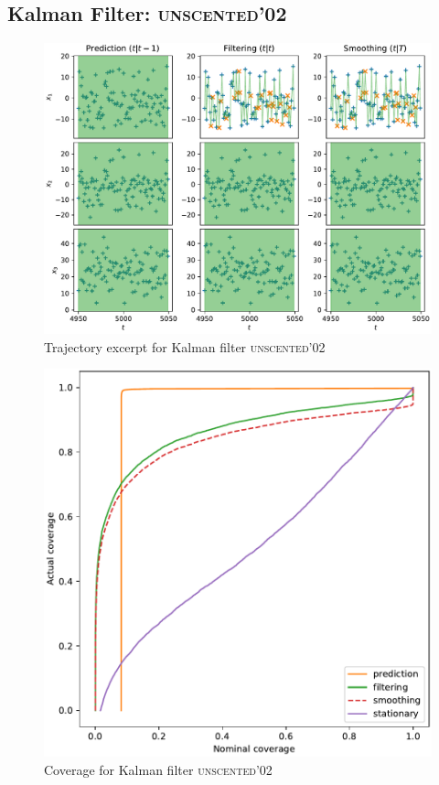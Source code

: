 \subsection{Kalman Filter: {\textsc{unscented'02}}}
\begin{figure}[H]
\begin{center}
\includegraphics[width=\linewidth]{generated/trajectory/Method.UNSCENTED1-Recalibrate.NO.pdf}
\end{center}
\caption{Trajectory excerpt for Kalman filter \textsc{{\textsc{unscented'02}}}}
\end{figure}
\begin{figure}[H]
\begin{center}
\includegraphics[width=\linewidth]{generated/coverage/Method.UNSCENTED1-Recalibrate.NO.pdf}
\end{center}
\caption{Coverage for Kalman filter \textsc{{\textsc{unscented'02}}}}
\end{figure}
